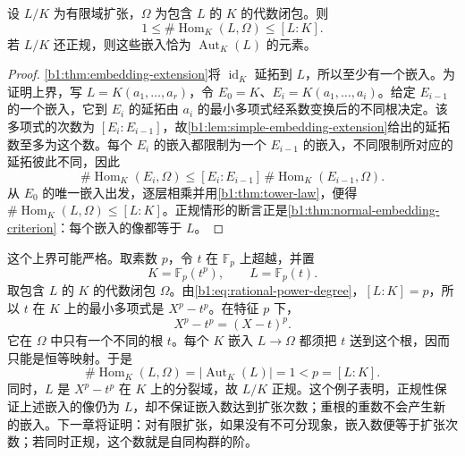 \begin{proposition}\label{b1:prop:embedding-degree-bound}
	设 \(L/K\) 为有限域扩张，\(\Omega\) 为包含 \(L\) 的 \(K\) 的代数闭包。则
	\[
		1\leq\#\operatorname{Hom}_K(L,\Omega)\leq[L:K].
	\]
	若 \(L/K\) 还正规，则这些嵌入恰为 \(\operatorname{Aut}_K(L)\) 的元素。
\end{proposition}
\begin{proof}
	\cref{b1:thm:embedding-extension}将 \(\operatorname{id}_K\) 延拓到 \(L\)，所以至少有一个嵌入。为证明上界，写 \(L=K(a_1,\ldots,a_r)\)，令 \(E_0=K\)、\(E_i=K(a_1,\ldots,a_i)\)。给定 \(E_{i-1}\) 的一个嵌入，它到 \(E_i\) 的延拓由 \(a_i\) 的最小多项式经系数变换后的不同根决定。该多项式的次数为 \([E_i:E_{i-1}]\)，故\cref{b1:lem:simple-embedding-extension}给出的延拓数至多为这个数。每个 \(E_i\) 的嵌入都限制为一个 \(E_{i-1}\) 的嵌入，不同限制所对应的延拓彼此不同，因此
	\[
		\#\operatorname{Hom}_K(E_i,\Omega) \leq [E_i:E_{i-1}]\,\#\operatorname{Hom}_K(E_{i-1},\Omega).
	\]
	从 \(E_0\) 的唯一嵌入出发，逐层相乘并用\cref{b1:thm:tower-law}，便得 \(\#\operatorname{Hom}_K(L,\Omega)\leq[L:K]\)。正规情形的断言正是\cref{b1:thm:normal-embedding-criterion}：每个嵌入的像都等于 \(L\)。
\end{proof}
这个上界可能严格。取素数 \(p\)，令 \(t\) 在 \(\mathbb F_p\) 上超越，并置
\[
	K=\mathbb F_p(t^p),\qquad L=\mathbb F_p(t).
\]
取包含 \(L\) 的 \(K\) 的代数闭包 \(\Omega\)。由\eqref{b1:eq:rational-power-degree}，\([L:K]=p\)，所以 \(t\) 在 \(K\) 上的最小多项式是 \(X^p-t^p\)。在特征 \(p\) 下，
\[
	X^p-t^p=(X-t)^p.
\]
它在 \(\Omega\) 中只有一个不同的根 \(t\)。每个 \(K\) 嵌入 \(L\rightarrow\Omega\) 都须把 \(t\) 送到这个根，因而只能是恒等映射。于是
\[
	\#\operatorname{Hom}_K(L,\Omega)=|\operatorname{Aut}_K(L)|=1<p=[L:K].
\]
同时，\(L\) 是 \(X^p-t^p\) 在 \(K\) 上的分裂域，故 \(L/K\) 正规。这个例子表明，正规性保证上述嵌入的像仍为 \(L\)，却不保证嵌入数达到扩张次数；重根的重数不会产生新的嵌入。下一章将证明：对有限扩张，如果没有不可分现象，嵌入数便等于扩张次数；若同时正规，这个数就是自同构群的阶。
